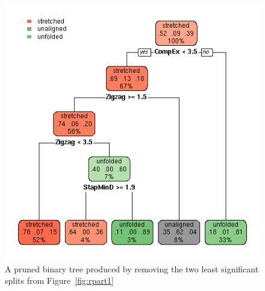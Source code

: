 %

\begin{figure}[!h]
  \centering
  \includegraphics[width=1.1\textwidth]{figrpart1p.png}
  \caption{A pruned binary tree produced by removing the two least significant splits from Figure~\ref{fig:rpart1}}
  \label{fig:rpart1p}
\end{figure}

%

